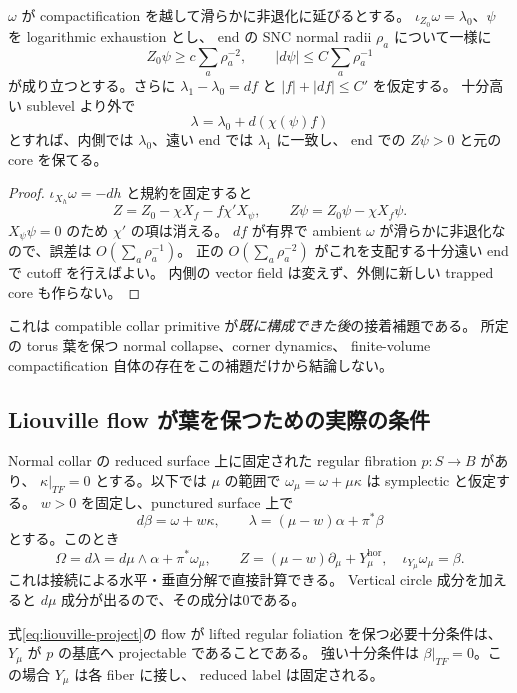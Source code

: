 \begin{lemma}\label{lem:end-cutoff}
$\omega$ が compactification を越して滑らかに非退化に延びるとする。
$\iota_{Z_0}\omega=\lambda_0$、$\psi$ を logarithmic exhaustion とし、
end の SNC normal radii $\rho_a$ について一様に
\[
Z_0\psi\ge c\sum_a\rho_a^{-2},\qquad
|d\psi|\le C\sum_a\rho_a^{-1}
\]
が成り立つとする。さらに
$\lambda_1-\lambda_0=df$ と $|f|+|df|\le C'$ を仮定する。
十分高い sublevel より外で
\[
\lambda=\lambda_0+d(\chi(\psi)f)
\]
とすれば、内側では $\lambda_0$、遠い end では $\lambda_1$ に一致し、
end での $Z\psi>0$ と元の core を保てる。
\end{lemma}

\begin{proof}
$\iota_{X_h}\omega=-dh$ と規約を固定すると
\[
Z=Z_0-\chi X_f-f\chi'X_\psi,\qquad
Z\psi=Z_0\psi-\chi X_f\psi.
\]
$X_\psi\psi=0$ のため $\chi'$ の項は消える。
$df$ が有界で ambient $\omega$ が滑らかに非退化なので、誤差は
$O(\sum_a\rho_a^{-1})$。
正の $O(\sum_a\rho_a^{-2})$ がこれを支配する十分遠い end で cutoff を行えばよい。
内側の vector field は変えず、外側に新しい trapped core も作らない。
\end{proof}

これは compatible collar primitive が\emph{既に構成できた後}の接着補題である。
所定の torus 葉を保つ normal collapse、corner dynamics、
finite-volume compactification 自体の存在をこの補題だけから結論しない。

\subsection{Liouville flow が葉を保つための実際の条件}\label{subsec:projectability}

Normal collar の reduced surface 上に固定された regular fibration $p:S\to B$ があり、
$\kappa|_{TF}=0$ とする。以下では $\mu$ の範囲で
$\omega_\mu=\omega+\mu\kappa$ は symplectic と仮定する。
$w>0$ を固定し、punctured surface 上で
\[
d\beta=\omega+w\kappa,\qquad
\lambda=(\mu-w)\alpha+\pi^*\beta
\]
とする。このとき
\begin{equation}\label{eq:liouville-project}
\Omega=d\lambda=d\mu\wedge\alpha+\pi^*\omega_\mu,\qquad
Z=(\mu-w)\partial_\mu+Y_\mu^{\mathrm{hor}},\quad
\iota_{Y_\mu}\omega_\mu=\beta.
\end{equation}
これは接続による水平・垂直分解で直接計算できる。
Vertical circle 成分を加えると $d\mu$ 成分が出るので、その成分は0である。

\begin{lemma}\label{lem:projectability}
式\eqref{eq:liouville-project}の flow が lifted regular foliation を保つ必要十分条件は、
$Y_\mu$ が $p$ の基底へ projectable であることである。
強い十分条件は $\beta|_{TF}=0$。この場合 $Y_\mu$ は各 fiber に接し、
reduced label は固定される。
\end{lemma}

